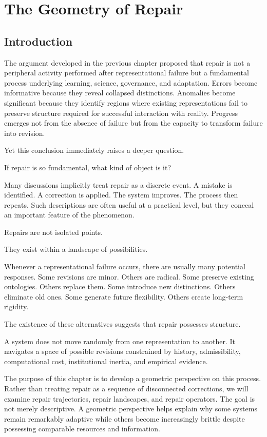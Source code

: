 \documentclass[11pt,oneside,openany]{book}
\begin{document}
\chapter{The Geometry of Repair}

\section{Introduction}

The argument developed in the previous chapter proposed that repair is not a peripheral activity performed after representational failure but a fundamental process underlying learning, science, governance, and adaptation. Errors become informative because they reveal collapsed distinctions. Anomalies become significant because they identify regions where existing representations fail to preserve structure required for successful interaction with reality. Progress emerges not from the absence of failure but from the capacity to transform failure into revision.

Yet this conclusion immediately raises a deeper question.

If repair is so fundamental, what kind of object is it?

Many discussions implicitly treat repair as a discrete event. A mistake is identified. A correction is applied. The system improves. The process then repeats. Such descriptions are often useful at a practical level, but they conceal an important feature of the phenomenon.

Repairs are not isolated points.

They exist within a landscape of possibilities.

Whenever a representational failure occurs, there are usually many potential responses. Some revisions are minor. Others are radical. Some preserve existing ontologies. Others replace them. Some introduce new distinctions. Others eliminate old ones. Some generate future flexibility. Others create long-term rigidity.

The existence of these alternatives suggests that repair possesses structure.

A system does not move randomly from one representation to another. It navigates a space of possible revisions constrained by history, admissibility, computational cost, institutional inertia, and empirical evidence.

The purpose of this chapter is to develop a geometric perspective on this process. Rather than treating repair as a sequence of disconnected corrections, we will examine repair trajectories, repair landscapes, and repair operators. The goal is not merely descriptive. A geometric perspective helps explain why some systems remain remarkably adaptive while others become increasingly brittle despite possessing comparable resources and information.
\end{document}
